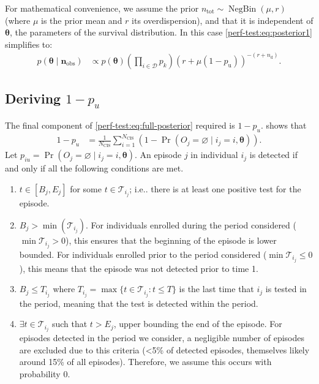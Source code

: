 \documentclass[referee,useAMS,usenatbib]{biom}
\makeatletter
\def\dist{\sim}
\DeclareMathOperator{\prob}{\mathrm{Pr}}
\DeclareMathOperator{\NBr}{NegBin}
\newcommand{\NBc}{\NBr}
\newcommand\set{\mathcal}
\renewcommand{\vec}[1]{\bm{#1}}
\newcommand{\ssep}{:}
\newcommand{\ntot}{n_\text{tot}}
\newcommand{\ndet}{n_\text{d}}
\newcommand{\pnodet}{p_\text{u}}
\newcommand{\Ncis}{N_\text{CIS}}
\newcommand{\na}{\vec{n}_\text{obs}}
\newcommand{\sched}{\mathcal{T}}
\DeclareRobustCommand\onedot{\futurelet\@let@token\@onedot}
\def\@onedot{\ifx\@let@token.\else.\null\fi\xspace}
\def\ie{i.e\onedot} \def\Ie{{I.e}\onedot}
\makeatother
\begin{document}
For mathematical convenience, we assume the prior $\ntot \dist \NBc(\mu, r)$ (where $\mu$ is the prior mean and $r$ its overdispersion), and that it is independent of $\vec{\theta}$, the parameters of the survival distribution.
In this case \cref{perf-test:eq:posterior1} simplifies to:
\begin{align}
p(\vec{\theta} \mid \na)
&\propto p(\vec{\theta}) \left( \prod_{i \in \set{D}} p_k \right) (r + \mu (1- \pnodet))^{-(r+\ndet)} \label{perf-test:eq:full-posterior}.
\end{align}

\subsection{Deriving $1 - p_u$} \label{sec:derive-prob-undetected}

The final component of \cref{perf-test:eq:full-posterior} required is $1 - p_u$.
 shows that
\begin{align}
  1 - p_u
  &= \frac{1}{\Ncis} \sum_{i=1}^{\Ncis} (1 - \prob(O_j = \varnothing \mid i_j = i, \vec{\theta})).
  \label{perf-test:eq:pu}
\end{align}
Let $p_{iu} = \prob(O_j = \varnothing \mid i_j = i, \vec{\theta})$.
An episode $j$ in individual $i_j$ is detected if and only if all the following conditions are met.
\begin{enumerate}
    \item 
    $t\in[B_j, E_j]$ for some $t \in \sched_{i_j}$;
    \ie there is at least one positive test for the episode.
    \item $B_j > \min ( \sched_{i_j} )$.
      For individuals enrolled during the period considered ($\min \sched_{i_j} > 0$), this ensures that the beginning of the episode is lower bounded.
      For individuals enrolled prior to the period considered ($\min \sched_{i_j} \leq 0$), this means that the episode was not detected prior to time 1.
    \item $B_j \leq T_{i_j}$ where $T_{i_j} = \max \{ t \in \sched_{i_j} \ssep t \leq T \}$ is the last time that $i_j$ is tested in the period, meaning that the test is detected within the period.
    \item $\exists t \in \sched_{i_j}$ such that $t > E_j$, upper bounding the end of the episode.
      For episodes detected in the period we consider, a negligible number of episodes are excluded due to this criteria (<5\% of detected episodes, themselves likely around 15\% of all episodes).
      Therefore, we assume this occurs with probability 0.
\end{enumerate}
\end{document}
